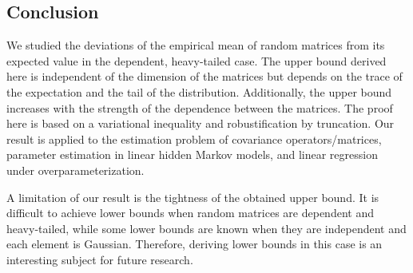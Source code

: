 \documentclass[11pt,a4paper]{article}
\theoremstyle{remark}
\theoremstyle{definition}
\theoremstyle{definition}
\begin{document}
\begin{bibunit}[apalike]
\section{Conclusion} \label{sec:conclusion}

We studied the deviations of the empirical mean of random matrices from its expected value in the dependent, heavy-tailed case. 
The upper bound derived here is independent of the dimension of the matrices but depends on the trace of the expectation and the tail of the distribution.
Additionally, the upper bound increases with the strength of the dependence between the matrices.
The proof here is based on a variational inequality and robustification by truncation. 
Our result is applied to the estimation problem of covariance operators/matrices, parameter estimation in linear hidden Markov models, and linear regression under overparameterization.

A limitation of our result is the tightness of the obtained upper bound. 
It is difficult to achieve lower bounds when random matrices are dependent and heavy-tailed, while some lower bounds are known when they are independent and each element is Gaussian.
Therefore, deriving lower bounds in this case is an interesting subject for future research.








\end{bibunit}
\end{document}
